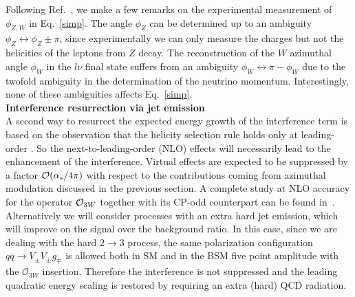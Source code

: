  
 Following Ref.~\cite{Panico:2017frx}, we make a few remarks on the experimental measurement  of $\phi_{Z,W}$ in Eq.~\ref{simp}.
 The angle $\phi_Z$  can be determined up to an ambiguity  $\phi_Z\leftrightarrow \phi_Z \pm \pi$,
 since experimentally we can only measure the charges but not the helicities of the  leptons from $Z$  decay.
 The reconstruction of the $W$  azimuthal  angle $\phi_W$ in the $l\nu$ final state  suffers from an ambiguity  $\phi_W \leftrightarrow \pi-\phi_W$ due to the twofold ambiguity in the determination of the neutrino momentum.
Interestingly, none of these ambiguities  affects  Eq.~\ref{simp}.\\

\noindent
{\bf Interference resurrection via jet emission}\\
\label{jetsol}
A second way to resurrect the expected energy growth of the 
interference term is based on the observation that the helicity 
selection rule holds only at leading-order \cite{Azatov:2017kzw}. 
So the next-to-leading-order (NLO) effects will necessarily lead to the 
enhancement of the interference.
Virtual effects are expected to be suppressed by a factor ${\cal{O}}( 
\alpha_s/4\pi)$ with respect to the contributions coming from azimuthal modulation discussed in the previous section. A complete study at NLO accuracy for the operator ${\cal O}_{3W}$ together with its CP-odd counterpart can be found in~\cite{Azatov:2019xxn}.
Alternatively we will consider processes with an extra hard jet emission, which will improve on the  signal over the  background ratio. 
 In this case,  since   we are dealing with the hard
  $2\to 3$ process,
 the same polarization configuration $q\bar{q}\to V_{\pm}V_{\pm}g_{\mp}$ is allowed both in SM and in the BSM five point amplitude with the $\mathcal{O}_{3W}$ insertion. Therefore the interference is not suppressed and the leading quadratic energy scaling is restored by requiring an extra (hard) QCD radiation.\\

